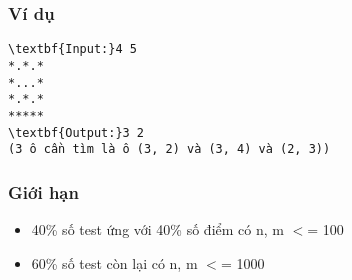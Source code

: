 \subsubsection{Ví dụ}
\begin{verbatim}
\textbf{Input:}4 5
*.*.*
*...*
*.*.*
*****
\textbf{Output:}3 2
(3 ô cần tìm là ô (3, 2) và (3, 4) và (2, 3))
\end{verbatim}

\subsubsection{Giới hạn}
\begin{itemize}
	\item 

40\% số test ứng với 40\% số điểm có n, m $<$= 100
	\item 

60\% số test còn lại có n, m $<$= 1000
\end{itemize}
\begin{verbatim}
 \end{verbatim}
